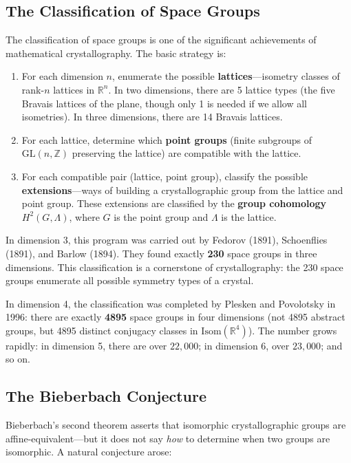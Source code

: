 \subsection{The Classification of Space Groups}

The classification of space groups is one of the significant achievements of mathematical crystallography. The basic strategy is:

\begin{enumerate}
    \item For each dimension $n$, enumerate the possible \textbf{lattices}---isometry classes of rank-$n$ lattices in $\mathbb{R}^n$. In two dimensions, there are 5 lattice types (the five Bravais lattices of the plane, though only 1 is needed if we allow all isometries). In three dimensions, there are 14 Bravais lattices.

    \item For each lattice, determine which \textbf{point groups} (finite subgroups of $\mathrm{GL}(n, \mathbb{Z})$ preserving the lattice) are compatible with the lattice.

    \item For each compatible pair (lattice, point group), classify the possible \textbf{extensions}---ways of building a crystallographic group from the lattice and point group. These extensions are classified by the \textbf{group cohomology} $H^2(G, \Lambda)$, where $G$ is the point group and $\Lambda$ is the lattice.
\end{enumerate}

In dimension 3, this program was carried out by Fedorov (1891), Schoenflies (1891), and Barlow (1894). They found exactly \textbf{230} space groups in three dimensions. This classification is a cornerstone of crystallography: the 230 space groups enumerate all possible symmetry types of a crystal.

In dimension 4, the classification was completed by Plesken and Povolotsky in 1996: there are exactly \textbf{4895} space groups in four dimensions (not 4895 abstract groups, but 4895 distinct conjugacy classes in $\mathrm{Isom}(\mathbb{R}^4)$). The number grows rapidly: in dimension 5, there are over $22{,}000$; in dimension 6, over $23{,}000$; and so on.

\subsection{The Bieberbach Conjecture}

Bieberbach's second theorem asserts that isomorphic crystallographic groups are affine-equivalent---but it does not say \emph{how} to determine when two groups are isomorphic. A natural conjecture arose:

